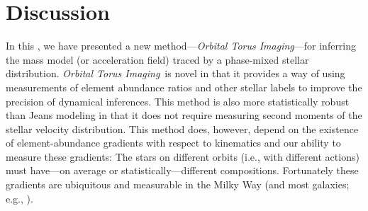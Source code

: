 \documentclass[modern]{aastex63}
\newcommand{\methodname}{\textsl{Orbital Torus Imaging}}
\newcommand{\mdisk}{\ensuremath{\mathrm{M}_\mathrm{disk}}}
\newcommand{\mratio}{\ensuremath{\mdisk / \mdisk^\star}}
\begin{document}



\section{Discussion}
\label{sec:discussion}

In this \documentname, we have presented a new method---\methodname---for
inferring the mass model (or acceleration field) traced by a phase-mixed
stellar distribution.
\methodname\ is novel in that it provides a way of using measurements of element
abundance ratios and other stellar labels to improve the precision of dynamical
inferences.
This method is also more statistically robust than Jeans modeling in that it
does not require measuring second moments of the stellar velocity distribution.
This method does, however, depend on the existence of element-abundance
gradients with respect to kinematics and our ability to measure these gradients:
The stars on different orbits (i.e., with different actions) must have---on
average or statistically---different compositions.
Fortunately these gradients are ubiquitous and measurable in the Milky Way (and
most galaxies; e.g., \citealt{Hayden:2015}).
\end{document}
